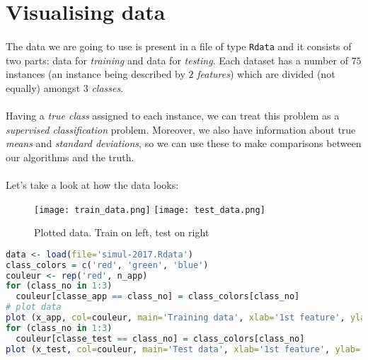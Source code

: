 \section{Visualising data}
\paragraph{}
The data we are going to use is present in a file of type \lstinline{Rdata} and it consists of two parts: data for \emph{training} and data for \emph{testing}.
Each dataset has a number of $75$ instances (an instance being described by $2$ \emph{features}) which are divided (not equally) amongst $3$ \emph{classes}.

\paragraph{}
Having a \emph{true class} assigned to each instance, we can treat this problem as a \emph{supervised classification} problem.
Moreover, we also have information about true \emph{means} and \emph{standard deviations}, so we can use these to make comparisons between our algorithms and the truth.

\paragraph{}
Let's take a look at how the data looks:

\begin{figure}[H]
    \centering
    \texttt{[image: train\_data.png]}
    \texttt{[image: test\_data.png]}
    \caption{Plotted data. Train on left, test on right}
    \label{data}
\end{figure}

\begin{lstlisting}[language=R, caption=Loading and visualising data]
data <- load(file='simul-2017.Rdata')
class_colors = c('red', 'green', 'blue')
couleur <- rep('red', n_app)
for (class_no in 1:3)
  couleur[classe_app == class_no] = class_colors[class_no]
# plot data
plot (x_app, col=couleur, main='Training data', xlab='1st feature', ylab='2nd feature')
for (class_no in 1:3)
  couleur[classe_test == class_no] = class_colors[class_no]
plot (x_test, col=couleur, main='Test data', xlab='1st feature', ylab='2nd feature')
\end{lstlisting}

\clearpage

